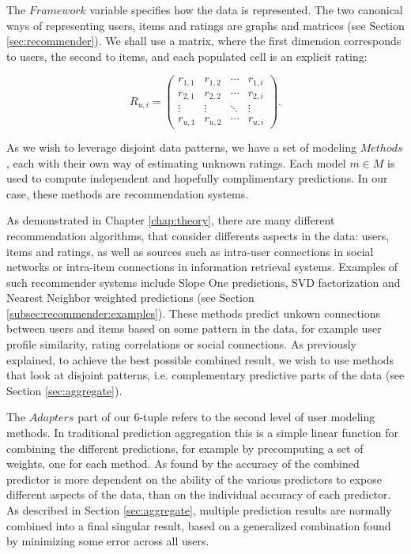 The $Framework$ variable specifies how the data is represented.
The two canonical ways of representing users, items and ratings are graphs and matrices (see Section \ref{sec:recommender}).
We shall use a matrix, where the first dimension corresponds to users, the second to items, and each populated cell is an explicit rating:

\begin{equation*}
 R_{u,i} =
 \begin{pmatrix}
  r_{1,1} & r_{1,2} & \cdots & r_{1,i} \\
  r_{2,1} & r_{2,2} & \cdots & r_{2,i} \\
  \vdots  & \vdots  & \ddots & \vdots  \\
  r_{u,1} & r_{u,2} & \cdots & r_{u,i}
 \end{pmatrix}.
\end{equation*}

As we wish to leverage disjoint data patterns, we have a set of modeling $Methods$, 
each with their own way of estimating unknown ratings. 
Each model $m \in M$ is used to compute independent and hopefully complimentary predictions.
In our case, these methods are recommendation systems.

As demonstrated in Chapter \ref{chap:theory}, there are many different recommendation algorithms,
that consider differents aspects in the data: users, items and ratings, as well as 
sources such as intra-user connections in social networks or intra-item connections in information retrieval systems.
Examples of such recommender systems include Slope One predictions, SVD factorization and Nearest Neighbor weighted predictions
(see Section \ref{subsec:recommender:examples}).
These methods predict unkown connections between users and items based on some pattern in the data,
for example user profile similarity, rating correlations or social connections.
As previously explained, to achieve the best possible combined result, we wish to use methods that look at disjoint patterns, 
i.e. complementary predictive parts of the data (see Section \ref{sec:aggregate}).

The $Adapters$ part of our 6-tuple refers to the second level of user modeling methods.
In traditional prediction aggregation this is a simple linear function for combining the different predictions,
for example by precomputing a set of weights, one for each method.
As found by \citet[p6]{Bell2007} the accuracy of the combined predictor is more dependent on the 
ability of the various predictors to expose different aspects of the data, than on 
the individual accuracy of each predictor.
As described in Section \ref{sec:aggregate}, multiple prediction results are normally 
combined into a final singular result,
based on a generalized combination found by minimizing some error across all users.

